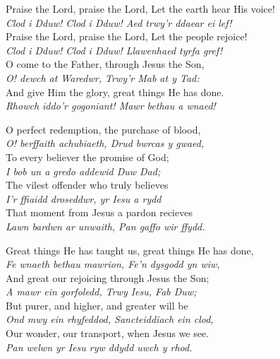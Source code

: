 \documentclass[aspectratio=169]{beamer}
\newcommand{\Eng}[1]{\textcolor{Eng}{\textsf{#1}}}
\newcommand{\Cym}[1]{\textcolor{Cym}{\textit{#1}}}
\begin{document}
{\begin{frame}{}
\Eng{Praise the Lord, praise the Lord, Let the earth hear His voice!}\\ 
\Cym{Clod i Dduw! Clod i Dduw! Aed trwy’r ddaear ei lef!}\\ 
\Eng{Praise the Lord, praise the Lord, Let the people rejoice!}\\ 
\Cym{Clod i Dduw! Clod i Dduw! Llawenhaed tyrfa gref!}\\ 
\Eng{O come to the Father, through Jesus the Son,}\\ 
\Cym{O! dewch at Waredwr, Trwy’r Mab at y Tad:}\\ 
\Eng{And give Him the glory, great things He has done.}\\ 
\Cym{Rhowch iddo’r gogoniant! Mawr bethau a wnaed!}

\end{frame}
\hypertarget{To God be the Glory[]2}{}
\begin{frame}{}
\fontsize{14.285714285714286}{17.142857142857142}\selectfont

\Eng{O perfect redemption, the purchase of blood,}\\ 
\Cym{O! berffaith achubiaeth, Drud bwrcas y gwaed,}\\ 
\Eng{To every believer the promise of God;}\\ 
\Cym{I bob un a gredo addewid Duw Dad;}\\ 
\Eng{The vilest offender who truly believes}\\ 
\Cym{I’r ffiaidd droseddwr, yr Iesu a rydd}\\ 
\Eng{That moment from Jesus a pardon recieves}\\ 
\Cym{Lawn bardwn ar unwaith, Pan gaffo wir ffydd.}

\end{frame}
\hypertarget{To God be the Glory[]3}{}
\begin{frame}{}
\fontsize{14.285714285714286}{17.142857142857142}\selectfont

\Eng{Great things He has taught us, great things He has done,}\\ 
\Cym{Fe wnaeth bethau mawrion, Fe’n dysgodd yn wiw,}\\ 
\Eng{And great our rejoicing through Jesus the Son;}\\ 
\Cym{A mawr ein gorfoledd, Trwy Iesu, Fab Duw;}\\ 
\Eng{But purer, and higher, and greater will be}\\ 
\Cym{Ond mwy ein rhyfeddod, Sancteiddiach ein clod,}\\ 
\Eng{Our wonder, our transport, when Jesus we see.}\\ 
\Cym{Pan welwn yr Iesu ryw ddydd uwch y rhod.}

\end{frame}
}
\end{document}
